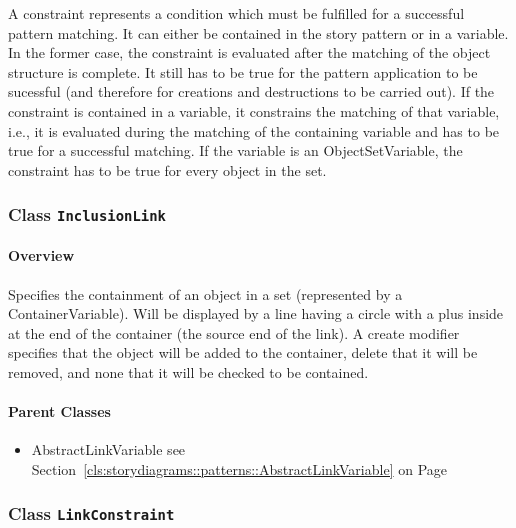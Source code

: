 	
			
A constraint represents a condition which must be fulfilled for a successful pattern matching. It can either be contained in the story pattern or in a variable. In the former case, the constraint is evaluated after the matching of the object structure is complete. It still has to be true for the pattern application to be sucessful (and therefore for creations and destructions to be carried out). If the constraint is contained in a variable, it constrains the matching of that variable, i.e., it is evaluated during the matching of the containing variable and has to be true for a successful matching. If the variable is an ObjectSetVariable, the constraint has to be true for every object in the set.	
		
	



\subsubsection{\Large{Class \bfseries \texttt{InclusionLink}\normalfont}}
\label{cls:storydiagrams::patterns::InclusionLink} 
\paragraph{Overview}

	
			
Specifies the containment of an object in a set (represented by a ContainerVariable). Will be displayed by a line having a circle with a plus inside at the end of the container (the source end of the link). A create modifier specifies that the object will be added to the container, delete that it will be removed, and none that it will be checked to be contained.	
		
	



\paragraph{Parent Classes}
\begin{itemize}
\item AbstractLinkVariable see Section~\ref{cls:storydiagrams::patterns::AbstractLinkVariable} on Page~\pageref{cls:storydiagrams::patterns::AbstractLinkVariable}\end{itemize}
\subsubsection{\Large{Class \bfseries \texttt{LinkConstraint}\normalfont}}
\label{cls:storydiagrams::patterns::LinkConstraint} 
